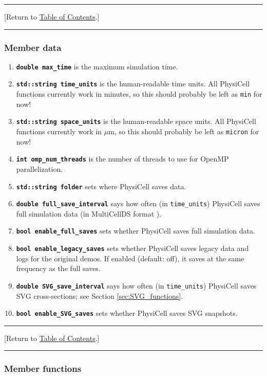 \documentclass[12pt]{article}
\newcommand{\micron}{\mu\textrm{m}}
\renewcommand{\v}{\verb}
\newcommand{\smallcode}[1]{\textbf{\texttt{#1}}}
\newcommand{\TOClink}{\begin{center}\hrule\vskip-10pt\phantom{.}\hfill[Return to \hyperlink{TOC}{Table of Contents}.]\hfill\phantom{.}\vskip3pt\hrule\end{center}}
\begin{document}
\TOClink 

\subsubsection{Member data}
\begin{enumerate}
\item 
\smallcode{double max\_time} is the maximum simulation time. 

\item 
\smallcode{std::string time\_units} is the human-readable time units. 
All PhysiCell functions currently work in minutes, so this should 
probably be left as \v|min| for now!

\item 
\smallcode{std::string space\_units} is the human-readable space units. 
All PhysiCell functions currently work in $\micron$, so this should 
probably be left as \v|micron| for now!

\item 
\smallcode{int omp\_num\_threads} is the number of threads to 
use for OpenMP parallelization. 

\item 
\smallcode{std::string folder} sets where PhysiCell saves data. 

\item 
\smallcode{double full\_save\_interval} says how often (in \v|time_units|) 
PhysiCell saves full simulation data (in MultiCellDS format \cite{ref:MultiCellDS}). 

\item 
\smallcode{bool enable\_full\_saves} sets whether PhysiCell saves 
full simulation data. 

\item 
\smallcode{bool enable\_legacy\_saves} sets whether PhysiCell saves 
legacy data and logs for the original demos. If enabled (default: off), 
it saves at the same frequency as the full saves. 

\item 
\smallcode{double SVG\_save\_interval} says how often (in \v|time_units|) 
PhysiCell saves SVG cross-sections; see Section \ref{sec:SVG_functions}. 

\item 
\smallcode{bool enable\_SVG\_saves} sets whether PhysiCell saves 
SVG snapshots.  
\end{enumerate}

\TOClink 

\subsubsection{Member functions}
\end{document}
